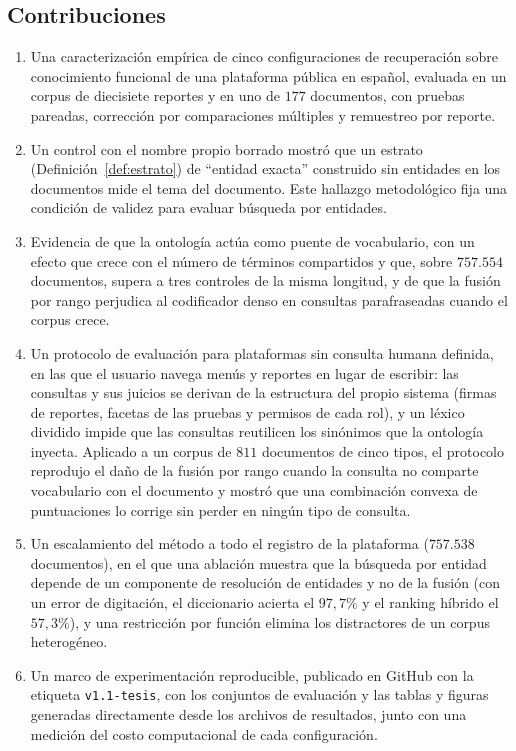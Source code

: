 \documentclass[11pt,letterpaper]{article}
\numberwithin{equation}{section}
\begin{document}
\subsection{Contribuciones}
\begin{enumerate}[leftmargin=2.2em,itemsep=1pt]
  \item Una caracterización empírica de cinco configuraciones de recuperación sobre conocimiento funcional de una plataforma pública en español, evaluada en un corpus de diecisiete reportes y en uno de $177$ documentos, con pruebas pareadas, corrección por comparaciones múltiples y remuestreo por reporte.
  \item Un control con el nombre propio borrado mostró que un estrato (Definición~\ref{def:estrato}) de ``entidad exacta'' construido sin entidades en los documentos mide el tema del documento. Este hallazgo metodológico fija una condición de validez para evaluar búsqueda por entidades.
  \item Evidencia de que la ontología actúa como puente de vocabulario, con un efecto que crece con el número de términos compartidos y que, sobre $757.554$ documentos, supera a tres controles de la misma longitud, y de que la fusión por rango perjudica al codificador denso en consultas parafraseadas cuando el corpus crece.
  \item Un protocolo de evaluación para plataformas sin consulta humana definida, en las que el usuario navega menús y reportes en lugar de escribir: las consultas y sus juicios se derivan de la estructura del propio sistema (firmas de reportes, facetas de las pruebas y permisos de cada rol), y un léxico dividido impide que las consultas reutilicen los sinónimos que la ontología inyecta. Aplicado a un corpus de $811$ documentos de cinco tipos, el protocolo reprodujo el daño de la fusión por rango cuando la consulta no comparte vocabulario con el documento y mostró que una combinación convexa de puntuaciones lo corrige sin perder en ningún tipo de consulta.
  \item Un escalamiento del método a todo el registro de la plataforma ($757.538$ documentos), en el que una ablación muestra que la búsqueda por entidad depende de un componente de resolución de entidades y no de la fusión (con un error de digitación, el diccionario acierta el $97{,}7\%$ y el ranking híbrido el $57{,}3\%$), y una restricción por función elimina los distractores de un corpus heterogéneo.
  \item Un marco de experimentación reproducible, publicado en GitHub con la etiqueta \texttt{v1.1-tesis}, con los conjuntos de evaluación y las tablas y figuras generadas directamente desde los archivos de resultados, junto con una medición del costo computacional de cada configuración.
\end{enumerate}
\end{document}
